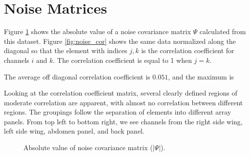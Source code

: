 \section{Noise Matrices}
Figure \ref{fig:noise_cov} shows the absolute value of a noise covariance matrix $\Psi$ calculated from this dataset.
Figure \ref{fig:noise_cor} shows the same data normalized along the diagonal so that the element with indices $j,k$ is
the correlation coefficient for channels $i$ and $k$. The correlation coefficient is equal to 1 when $j=k$.

The average off diagonal correlation coefficient is $0.051$, and the maximum is 

Looking at the correlation coefficient matrix, several clearly defined regions of moderate correlation are apparent,
with almost no correlation between different regions. The groupings follow the separation of elements into different
array panels. From top left to bottom right, we see channels from the right side wing, left side wing,
abdomen panel, and back panel.

\begin{figure}
    \caption{Absolute value of noise covariance matrix ($|\Psi|$).}
\label{fig:noise_cov}
\end{figure}

